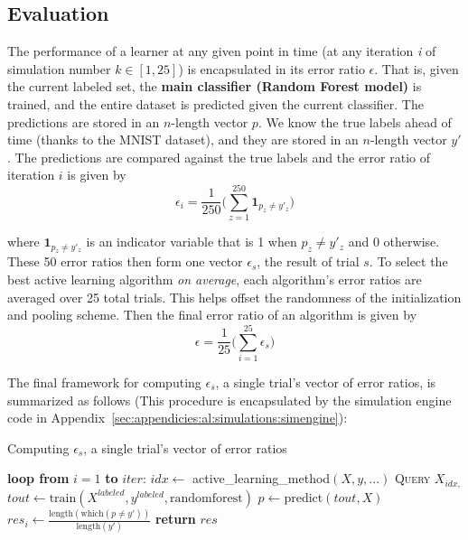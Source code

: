 \subsection{Evaluation}
\label{sec:al:simulation:evaluation}
The performance of a learner at any given point in time (at any iteration 
\textit{i} of simulation number $k \in [1,25]$) is encapsulated in its error 
ratio $\epsilon$. That is, given the current labeled set, the \textbf{main 
classifier (Random Forest model)} is trained, and the entire dataset is 
predicted given the current classifier. The predictions are stored in an 
$n$-length vector $p$. 
We know the true labels ahead of time (thanks to the MNIST dataset), and they 
are stored in an $n$-length vector $y'$. The predictions are compared against 
the true labels and the error ratio of iteration $i$ is given by
$$\epsilon_i = \frac{1}{250} \bigg( \sum\limits_{z=1}^{250} 
\textbf{1}_{p_z \neq y'_z} \bigg)$$

\noindent where $\textbf{1}_{p_z \neq y'_z}$ is an indicator variable that is 1 
when $p_z \neq y'_z$ and 0 otherwise. These 50 error ratios then form one 
vector $\epsilon_s$, the result of trial 
$s$. To select the best active learning algorithm \textit{on average}, each 
algorithm's error ratios are averaged over 25 total trials. This helps offset 
the randomness of the initialization and pooling scheme. Then the final error 
ratio of an algorithm is given by
$$\epsilon = \frac{1}{25} \bigg( \sum\limits_{i=1}^{25} \epsilon_s \bigg)$$

The final framework for computing $\epsilon_s$, a single trial's vector of 
error ratios, is summarized as follows (This procedure is encapsulated by the 
simulation engine code in 
Appendix~\ref{sec:appendicies:al:simulations:simengine}):

\tablespacing
\begin{algorithm}[H]
	\caption{Computing $\epsilon_s$, a single trial's vector of error 
	ratios}\label{alg:al:simulation:evaluation}
	\begin{algorithmic}[1]
		\State \textbf{loop from} $i=1$ \textbf{to} $iter$:
		\State \indent $idx \gets $ active\_learning\_method$(X,y,...)$
		\State \indent \textsc{Query} $X_{idx,}$
		\State \indent $tout \gets 
		\text{train}(X^{labeled},y^{labeled},\text{randomforest})$
		\State \indent $p \gets \text{predict}(tout,X)$
		\State \indent $res_i\gets \frac{\text{length}(\text{which}(p \neq y'))}
		{\text{length}(y')}$
		\State \textbf{return} $res$
		\EndProcedure
	\end{algorithmic}
\end{algorithm}
\bodyspacing

